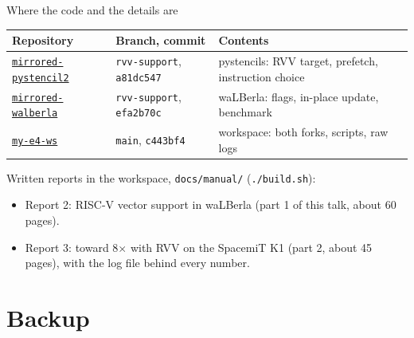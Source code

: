 \documentclass[aspectratio=169,10pt,t]{beamer}
\newcommand{\sx}[1]{#1\ensuremath{\times}} %
\newcommand{\code}[1]{\texttt{#1}}
\begin{document}
\begin{frame}{Where the code and the details are}
  \vspace{1mm}
  \small
  \begin{tabularx}{\textwidth}{@{}l l X@{}}
    \toprule
    Repository & Branch, commit & Contents\\
    \midrule
    \href{https://github.com/salehjg/mirrored-pystencil2/tree/rvv-support}{\code{mirrored-pystencil2}}
      & \code{rvv-support}, \code{a81dc547} & pystencils: RVV target, prefetch, instruction choice\\
    \href{https://github.com/salehjg/mirrored-walberla/tree/rvv-support}{\code{mirrored-walberla}}
      & \code{rvv-support}, \code{efa2b70c} & waLBerla: flags, in-place update, benchmark\\
    \href{https://github.com/salehjg/my-e4-ws}{\code{my-e4-ws}} & \code{main}, \code{c443bf4}
      & workspace: both forks, scripts, raw logs\\
    \bottomrule
  \end{tabularx}

  \vspace{4mm}
  Written reports in the workspace, \code{docs/manual/} (\code{./build.sh}):
  \begin{itemize}\small
    \item Report 2: RISC-V vector support in waLBerla (part 1 of this talk, about 60 pages).
    \item Report 3: toward \sx{8} with RVV on the SpacemiT K1 (part 2, about 45 pages), with
          the log file behind every number.
  \end{itemize}
  \vfill
  \vspace{2mm}
\end{frame}

\appendix
\section{Backup}
\end{document}
